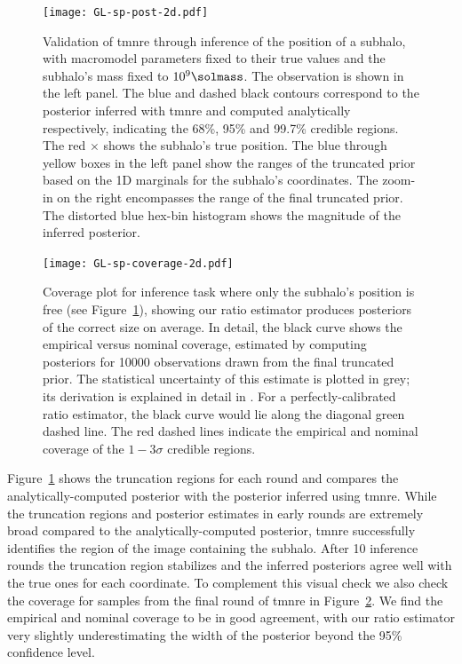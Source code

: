 \begin{figure}
    \centering
    \texttt{[image: GL-sp-post-2d.pdf]}
    \caption{Validation of \gls*{tmnre} through inference of the position of a subhalo, with macromodel parameters fixed to their true values and the subhalo's mass fixed to $10^9\si{\solmass}$. The observation is shown in the left panel. The blue and dashed black contours correspond to the posterior inferred with \gls*{tmnre} and computed analytically respectively, indicating the 68\%, 95\% and 99.7\% credible regions. The red {\color{red} $\times$} shows the subhalo's true position. The blue through yellow boxes in the left panel show the ranges of the truncated prior based on the 1D marginals for the subhalo's coordinates. The zoom-in on the right encompasses the range of the final truncated prior. The distorted blue hex-bin histogram shows the magnitude of the inferred posterior.}
    \label{fig:gl-sp-post}
\end{figure}

\begin{figure}
    \centering
    \texttt{[image: GL-sp-coverage-2d.pdf]}
    \caption{Coverage plot for inference task where only the subhalo's position is free (see Figure~\ref{fig:gl-sp-post}), showing our ratio estimator produces posteriors of the correct size on average. In detail, the black curve shows the empirical versus nominal coverage, estimated by computing posteriors for \num{10000} observations drawn from the final truncated prior. The statistical uncertainty of this estimate is plotted in grey; its derivation is explained in detail in \cite{Cole:2021gwr}. For a perfectly-calibrated ratio estimator, the black curve would lie along the diagonal green dashed line. The red dashed lines indicate the empirical and nominal coverage of the $1 - 3 \sigma$ credible regions.}
    \label{fig:gl-sp-coverage}
\end{figure}

Figure~\ref{fig:gl-sp-post} shows the truncation regions for each round and compares the analytically-computed posterior with the posterior inferred using \gls*{tmnre}. While the truncation regions and posterior estimates in early rounds are extremely broad compared to the analytically-computed posterior, \gls*{tmnre} successfully identifies the region of the image containing the subhalo. After 10 inference rounds the truncation region stabilizes and the inferred posteriors agree well with the true ones for each coordinate. To complement this visual check we also check the coverage for samples from the final round of \gls*{tmnre} in Figure~\ref{fig:gl-sp-coverage}. We find the empirical and nominal coverage to be in good agreement, with our ratio estimator very slightly underestimating the width of the posterior beyond the 95\% confidence level.

